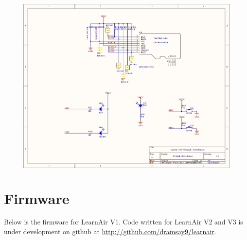 \begin{figure}[htb]
	\includegraphics[width=\textwidth + \marginparwidth]{schematics/l3_schematic2}     
\end{figure}

\FloatBarrier
\section{Firmware}
\FloatBarrier

Below is the firmware for LearnAir V1.  Code written for LearnAir V2 and V3 is under development on github at \url{http://github.com/dramsay9/learnair}.

